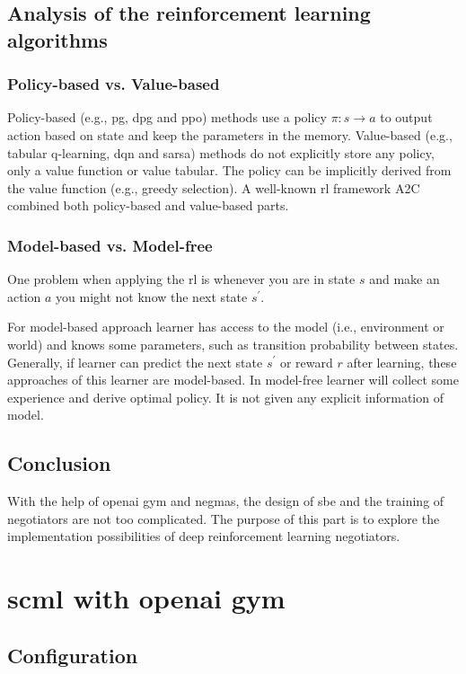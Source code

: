 \subsection{Analysis of the reinforcement learning algorithms}
\subsubsection{Policy-based vs. Value-based}
Policy-based (e.g., \gls{pg}, \gls{dpg} and \gls{ppo}) methods use a policy $\pi:s \to a$ to output action based on state and keep the parameters in the memory. Value-based (e.g., tabular q-learning, \gls{dqn} and \gls{sarsa}) methods do not explicitly store any policy, only a value function or value tabular. The policy can be implicitly derived from the value function (e.g., greedy selection). A well-known \gls{rl} framework A2C combined both policy-based and value-based parts.

\subsubsection{Model-based vs. Model-free}
One problem when applying the \gls{rl} is whenever you are in state $s$ and make an action $a$ you might not know the next state $s^{\prime}$.

For model-based approach learner has access to the model (i.e., environment or world) and knows some parameters, such as transition probability between states. Generally, if learner can predict the next state $s^{\prime}$ or reward $r$ after learning, these approaches of this learner are model-based. In model-free learner will collect some experience and derive optimal policy. It is not given any explicit information of model.

\subsection{Conclusion}
With the help of \gls{openai gym} and \gls{negmas}, the design of \gls{sbe} and the training of negotiators are not too complicated. The purpose of this part is to explore the implementation possibilities of deep reinforcement learning negotiators.

\section{\gls{scml} with \gls{openai gym}}
\subsection{Configuration}

